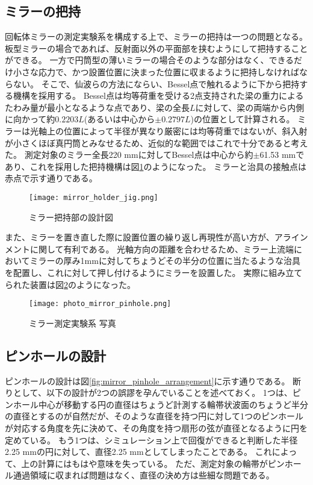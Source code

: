 \subsection{ミラーの把持}
回転体ミラーの測定実験系を構成する上で、ミラーの把持は一つの問題となる。
板型ミラーの場合であれば、反射面以外の平面部を挟むようにして把持することができる。
一方で円筒型の薄いミラーの場合そのような部分はなく、できるだけ小さな応力で、かつ設置位置に決まった位置に収まるように把持しなければならない。
そこで、仙波らの方法にならい、Bessel点で触れるように下から把持する機構を採用する。\cite{Senba2010}
Bessel点は均等荷重を受ける2点支持された梁の重力によるたわみ量が最小となるような点であり、梁の全長$L$に対して、梁の両端から内側に向かって約$0.2203L$(あるいは中心から$\pm 0.2797 L$)の位置として計算される。
ミラーは光軸上の位置によって半径が異なり厳密には均等荷重ではないが、斜入射が小さくほぼ真円筒とみなせるため、近似的な範囲ではこれで十分であると考えた。
測定対象のミラー全長220 mmに対してBessel点は中心から約$\pm$61.53 mmであり、これを採用した把持機構は図\ref{fig:mirror_holder_jig}のようになった。
ミラーと治具の接触点は赤点で示す通りである。

\begin{figure}[!ht]
\centering
\texttt{[image: mirror\_holder\_jig.png]}
\caption{ミラー把持部の設計図}
\label{fig:mirror_holder_jig}
\end{figure}

また、ミラーを置き直した際に設置位置の繰り返し再現性が高い方が、アラインメントに関して有利である。
光軸方向の距離を合わせるため、ミラー上流端においてミラーの厚み1mmに対してちょうどその半分の位置に当たるような治具を配置し、これに対して押し付けるようにミラーを設置した。
実際に組み立てられた装置は図\ref{fig:photo_mirror_experiment_mirror_and_pinhole}のようになった。

\begin{figure}[!ht]
\centering
\texttt{[image: photo\_mirror\_pinhole.png]}
\caption{ミラー測定実験系 写真}
\label{fig:photo_mirror_experiment_mirror_and_pinhole}
\end{figure}


\subsection{ピンホールの設計}

ピンホールの設計は図\ref{fig:mirror_pinhole_arrangement}に示す通りである。
断りとして、以下の設計が2つの誤謬を孕んでいることを述べておく。
1つは、ピンホール中心が移動する円の直径はちょうど計測する輪帯状波面のちょうど半分の直径とするのが自然だが、そのような直径を持つ円に対して1つのピンホールが対応する角度を先に決めて、その角度を持つ扇形の弦が直径となるように円を定めている。
もう1つは、シミュレーション上で回復ができると判断した半径2.25 mmの円に対して、直径2.25 mmとしてしまったことである。
これによって、上の計算にはもはや意味を失っている。
ただ、測定対象の輪帯がピンホール通過領域に収まれば問題はなく、直径の決め方は些細な問題である。

